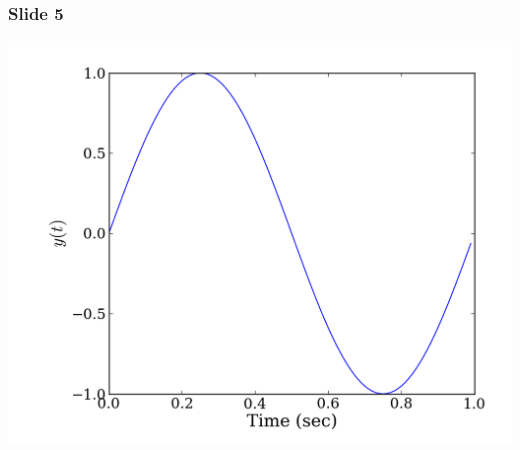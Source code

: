 \documentclass[t,english]{beamer}
\begin{document}
\begin{frame}[fragile]
\frametitle{Slide 5}


\includegraphics[height=0.75\textheight]{plot.png}
\end{frame}
\end{document}
